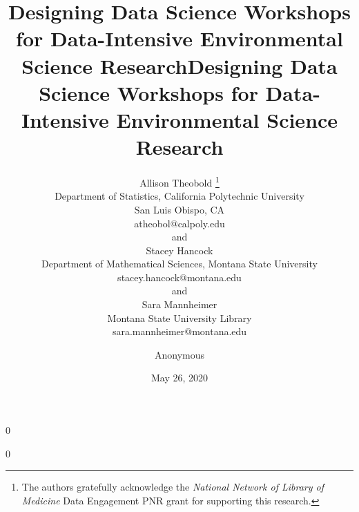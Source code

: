 \documentclass[12pt]{article}
\date{May 26, 2020}
\newcommand{\blind}{0}
\begin{document}
\def\spacingset#1{\renewcommand{\baselinestretch}%
{#1}\small\normalsize} \spacingset{1}



\blind
{
  \title{\bf Designing Data Science Workshops for Data-Intensive Environmental 
  Science Research}
  \author{Allison Theobold \thanks{The authors gratefully acknowledge the 
  \textit{National Network of Library of Medicine}
    Data Engagement PNR grant for supporting this research.} \hspace{.2cm}\\
    Department of Statistics, California Polytechnic University \\
    San Luis Obispo, CA \\
    atheobol@calpoly.edu \\
    and \\
    Stacey Hancock \\
    Department of Mathematical Sciences, Montana State University \\
    stacey.hancock@montana.edu \\
    and \\
    Sara Mannheimer \\
    Montana State University Library \\
    sara.mannheimer@montana.edu
    }
  \maketitle 
} \fi

\blind
{
  \title{\bf Designing Data Science Workshops for Data-Intensive Environmental
  Science Research}
  \author{Anonymous}
  \date{}
  \maketitle
} \fi

\bigskip
\end{document}
